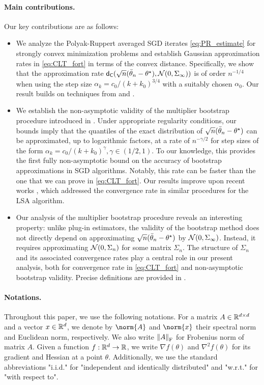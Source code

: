 \paragraph{Main contributions.} Our key contributions are as follows:
\begin{itemize}[noitemsep, nolistsep]
    \item We analyze the Polyak-Ruppert averaged SGD iterates \eqref{eq:PR_estimate} for strongly convex minimization problems and establish Gaussian approximation rates in \eqref{eq:CLT_fort} in terms of the convex distance. Specifically, we show that the approximation rate $\mathsf{d}_{\mathsf{C}}(\sqrt{n}(\bar{\theta}_{n} - \theta^\star), \mathcal{N}(0,\Sigma_\infty))$ is of order $n^{-1/4}$ when using the step size $\alpha_k = c_0/(k+k_0)^{3/4}$ with a suitably chosen $\alpha_0$. Our result builds on techniques from \cite{shao2022berry} and \cite{wu2024statistical}. 
    \item We establish the non-asymptotic validity of the multiplier bootstrap procedure introduced in \cite{JMLR:v19:17-370}. Under appropriate regularity conditions, our bounds imply that the quantiles of the exact distribution of $\sqrt{n}(\bar{\theta}_{n} - \theta^\star)$ can be approximated, up to logarithmic factors, at a rate of $n^{-\gamma/2}$ for step sizes of the form $\alpha_k = c_0/(k+k_0)^{\gamma}, \gamma \in (1/2,1)$. To our knowledge, this provides the first fully non-asymptotic bound on the accuracy of bootstrap approximations in SGD algorithms. Notably, this rate can be faster than the one that we can prove in \eqref{eq:CLT_fort}. Our results improve upon recent works \cite{samsonov2024gaussian, wu2024statistical}, which addressed the convergence rate in similar procedures for the LSA algorithm.
    \item Our analysis of the multiplier bootstrap procedure reveals an interesting property: unlike plug-in estimators, the validity of the bootstrap method does not directly depend  on approximating $\sqrt{n}(\bar{\theta}_{n} - \theta^\star)$ by $\mathcal{N}(0,\Sigma_\infty)$. Instead, it requires approximating $\mathcal{N}(0,\Sigma_n)$ for some matrix $\Sigma_n$. The structure of $\Sigma_n$ and its associated convergence rates play a central role in our present analysis, both for convergence rate in \eqref{eq:CLT_fort} and non-asymptotic bootstrap validity. Precise definitions are provided in .
\end{itemize}


\paragraph{Notations.} Throughout this paper, we use the following notations. For a matrix $A \in \mathbb{R}^{d \times d}$ and a vector $x \in \mathbb{R}^{d}$, we denote by $\norm{A}$ and $\norm{x}$ their spectral norm and Euclidean norm, respectively. We also write $\left\Vert A \right\Vert_{\mathrm{F}}$ for Frobenius norm of matrix $A$. Given a function $f: \mathbb{R}^{d} \to \mathbb{R}$, we write $\nabla f(\theta)$ and $\nabla^2 f(\theta)$ for its gradient and Hessian at a point $\theta$.  Additionally, we use the standard abbreviations "i.i.d." for "independent and identically distributed" and "w.r.t." for "with respect to".

